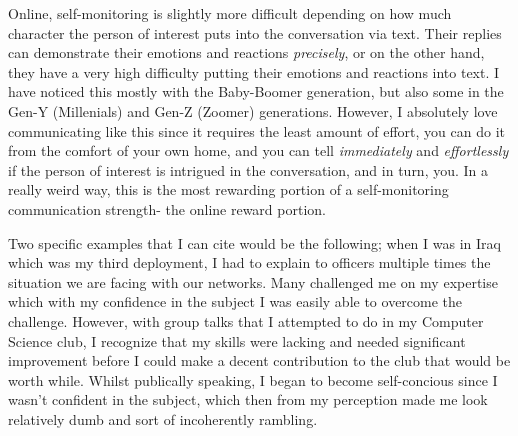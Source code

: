 \documentclass[12pt]{article}
\begin{document}
\par
Online, self-monitoring is slightly more difficult depending on how much character the person of interest puts into the conversation via text. Their replies can demonstrate their emotions and reactions \emph{precisely}, or on the other hand, they have a very high difficulty putting their emotions and reactions into text. I have noticed this mostly with the Baby-Boomer generation, but also some in the Gen-Y (Millenials) and Gen-Z (Zoomer) generations. However, I absolutely love communicating like this since it requires the least amount of effort, you can do it from the comfort of your own home, and you can tell \emph{immediately} and \emph{effortlessly} if the person of interest is intrigued in the conversation, and in turn, you. In a really weird way, this is the most rewarding portion of a self-monitoring communication strength- the online reward portion.
\par
Two specific examples that I can cite would be the following; when I was in Iraq which was my third deployment, I had to explain to officers multiple times the situation we are facing with our networks. Many challenged me on my expertise which with my confidence in the subject I was easily able to overcome the challenge. However, with group talks that I attempted to do in my Computer Science club, I recognize that my skills were lacking and needed significant improvement before I could make a decent contribution to the club that would be worth while. Whilst publically speaking, I began to become self-concious since I wasn't confident in the subject, which then from my perception made me look relatively dumb and sort of incoherently rambling.
\end{document}
